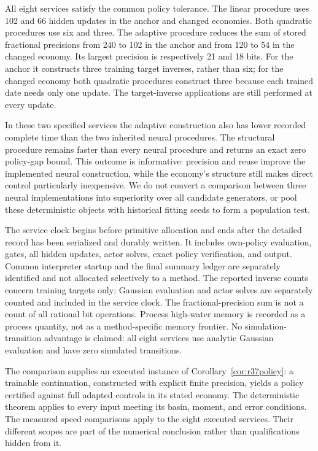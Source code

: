 

All eight services satisfy the common policy tolerance. The linear procedure
uses 102 and 66 hidden updates in the anchor and changed economies. Both
quadratic procedures use six and three. The adaptive procedure reduces the
sum of stored fractional precisions from 240 to 102 in the anchor and from
120 to 54 in the changed economy. Its largest precision is respectively
21 and 18 bits. For the anchor it constructs three training target inverses,
rather than six; for the changed economy both quadratic procedures construct
three because each trained date needs only one update. The target-inverse
applications are still performed at every update.

In these two specified services the adaptive construction also has lower
recorded complete time than the two inherited neural procedures. The
structural procedure remains faster than every neural procedure and returns
an exact zero policy-gap bound. This outcome is informative: precision and
reuse improve the implemented neural construction, while the economy's
structure still makes direct control particularly inexpensive. We do not
convert a comparison between three neural implementations into superiority
over all candidate generators, or pool these deterministic objects with
historical fitting seeds to form a population test.

The service clock begins before primitive allocation and ends after the
detailed record has been serialized and durably written. It includes
own-policy evaluation, gates, all hidden updates, actor solves, exact policy
verification, and output. Common interpreter startup and the final summary
ledger are separately identified and not allocated selectively to a method.
The reported inverse counts concern training targets only; Gaussian evaluation
and actor solves are separately counted and included in the service clock.
The fractional-precision sum is not a count of all rational bit operations.
Process high-water memory is recorded as a process quantity, not as a
method-specific memory frontier. No simulation-transition advantage is claimed:
all eight services use analytic Gaussian evaluation and have zero simulated
transitions.

The comparison supplies an executed instance of
Corollary~\ref{cor:r37policy}: a trainable continuation, constructed with
explicit finite precision, yields a policy certified against full adapted
controls in its stated economy. The deterministic theorem applies to every
input meeting its basin, moment, and error conditions. The measured speed
comparisons apply to the eight executed services. Their different scopes are
part of the numerical conclusion rather than qualifications hidden from it.
